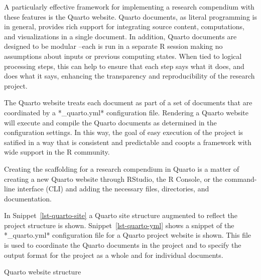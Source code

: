 \documentclass[
  letterpaper,
]{book}
\theoremstyle{definition}
\theoremstyle{remark}
\begin{document}
A particularly effective framework for implementing a research
compendium with these features is the Quarto website. Quarto documents,
as literal programming is in general, provides rich support for
integrating source content, computations, and visualizations in a single
document. In addition, Quarto documents are designed to be modular
--each is run in a separate R session making no assumptions about inputs
or previous computing states. When tied to logical processing steps,
this can help to ensure that each step says what it does, and does what
it says, enhancing the transparency and reproducibility of the research
project.

The Quarto website treats each document as part of a set of documents
that are coordinated by a *\_quarto.yml* configuration file. Rendering a
Quarto website will execute and compile the Quarto documents as
determined in the configuration settings. In this way, the goal of easy
execution of the project is satified in a way that is consistent and
predictable and coopts a framework with wide support in the R community.

Creating the scaffolding for a research compendium in Quarto is a matter
of creating a new Quarto website through RStudio, the R Console, or the
command-line interface (CLI) and adding the necessary files,
directories, and documentation.

In Snippet~\ref{lst-quarto-site} a Quarto site structure augmented to
reflect the project structure is shown. Snippet~\ref{lst-quarto-yml}
shows a snippet of the *\_quarto.yml* configuration file for a Quarto
project website is shown. This file is used to coordinate the Quarto
documents in the project and to specify the output format for the
project as a whole and for individual documents.

\begin{codelisting}

\caption{\label{lst-quarto-site}Quarto website structure}


\end{codelisting}%
\end{document}
